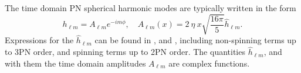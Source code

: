 \documentclass[twocolumn,prd,aps,superscriptaddress,preprintnumbers,tightenlines,showpacs,nofootinbib,eqsecnum,amsfonts,amsmath]{revtex4}
\begin{document}
The time domain PN spherical harmonic modes are typically written in the form
\begin{equation}\label{eq:global}
h_{\ell m} = A_{\ell m} e^{-i m \phi}, \quad A_{\ell m}(x) = 2 \:\eta \: x \sqrt{\frac{16 \pi}{5}} \hat{h}_{\ell m}.
\end{equation}
Expressions for the $\hat{h}_{\ell m}$ can be found in \cite{Blanchet2014}, \cite{Arun:2008kb} and \cite{Buonanno},
including non-spinning terms up to 3PN order, and spinning
terms up to 2PN order.
The quantities $\hat{h}_{\ell m}$, and with them the time domain amplitudes  $A_{\ell m}$ are complex functions. 
%
\end{document}
